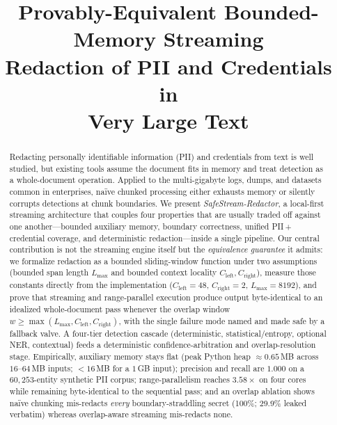 \documentclass[conference]{IEEEtran}
\begin{document}
\title{Provably-Equivalent Bounded-Memory Streaming\\
Redaction of PII and Credentials in\\
Very Large Text}

\author{
}

\maketitle

\begin{abstract}
Redacting personally identifiable information (PII) and credentials from text
is well studied, but existing tools assume the document fits in memory and treat
detection as a whole-document operation. Applied to the multi-gigabyte logs,
dumps, and datasets common in enterprises, na\"ive chunked processing either
exhausts memory or silently corrupts detections at chunk boundaries. We present
\emph{SafeStream-Redactor}, a local-first streaming architecture that couples
four properties that are usually traded off against one another---bounded
auxiliary memory, boundary correctness, unified PII\,+\,credential coverage, and
deterministic redaction---inside a single pipeline. Our central contribution is
not the streaming engine itself but the \emph{equivalence guarantee} it admits:
we formalize redaction as a bounded sliding-window function under two
assumptions (bounded span length $L_{\max}$ and bounded context locality
$C_{\mathrm{left}},C_{\mathrm{right}}$), measure those constants directly from
the implementation ($C_{\mathrm{left}}{=}48$, $C_{\mathrm{right}}{=}2$,
$L_{\max}{=}8192$), and prove that streaming and range-parallel execution produce
output byte-identical to an idealized whole-document pass whenever the overlap
window $w\!\ge\!\max(L_{\max},C_{\mathrm{left}},C_{\mathrm{right}})$, with the
single failure mode named and made safe by a fallback valve. A four-tier
detection cascade (deterministic, statistical/entropy, optional NER, contextual)
feeds a deterministic confidence-arbitration and overlap-resolution stage.
Empirically, auxiliary memory stays flat (peak Python heap $\approx0.65$\,MB
across $16$--$64$\,MB inputs; ${<}16$\,MB for a $1$\,GB input); precision and
recall are $1.000$ on a $60{,}253$-entity synthetic PII corpus;
range-parallelism reaches $3.58\times$ on four cores while remaining
byte-identical to the sequential pass; and an overlap ablation shows na\"ive
chunking mis-redacts \emph{every} boundary-straddling secret (100\%; 29.9\%
leaked verbatim) whereas overlap-aware streaming mis-redacts none.
\end{abstract}
\end{document}

